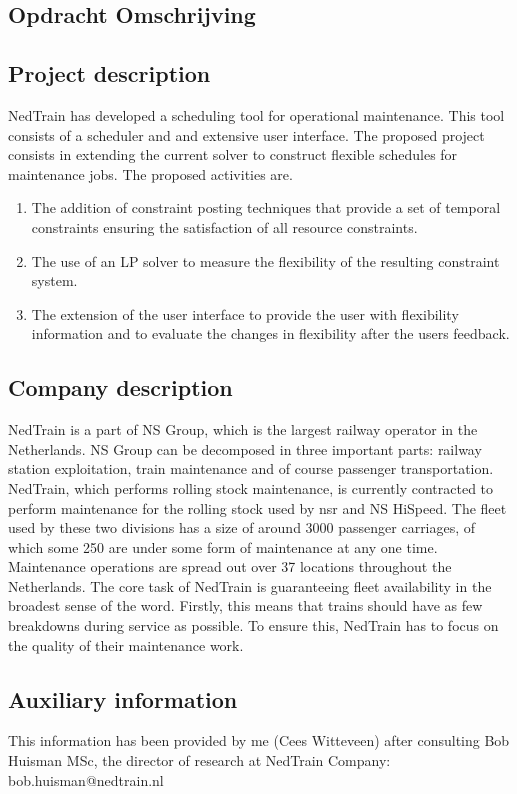 \begin{appendices}
\section{Opdracht Omschrijving} \label{app:A}
\subsection*{Project description}
NedTrain has developed a scheduling tool for operational maintenance. This tool consists of a scheduler and and extensive user interface. The proposed project consists in extending the current solver to construct flexible schedules for maintenance jobs. The proposed activities are.

\begin{enumerate}
	\item The addition of constraint posting techniques that provide a set of temporal constraints ensuring the satisfaction of all resource constraints.
	\item The use of an LP solver to measure the flexibility of the resulting constraint system.
	\item The extension of the user interface to provide the user with flexibility information and to evaluate the changes in flexibility after the users feedback.
\end{enumerate}

\subsection*{Company description}

NedTrain is a part of NS Group, which is the largest railway operator in the Netherlands. NS Group can be decomposed in three important parts: railway station exploitation, train maintenance and of course passenger transportation. NedTrain, which performs rolling stock maintenance, is currently contracted to perform maintenance for the rolling stock used by nsr and NS HiSpeed. The fleet used by these two divisions has a size of around 3000 passenger carriages, of which some 250 are under some form of maintenance at any one time. Maintenance operations are spread out over 37 locations throughout the Netherlands. The core task of NedTrain is guaranteeing fleet availability in the broadest sense of the word. Firstly, this means that trains should have as few breakdowns during service as possible. To ensure this, NedTrain has to focus on the quality of their maintenance work.

\subsection*{Auxiliary information}

This information has been provided by me (Cees Witteveen) after consulting Bob Huisman MSc, the director of research at NedTrain Company: bob.huisman@nedtrain.nl
\end{appendices}
